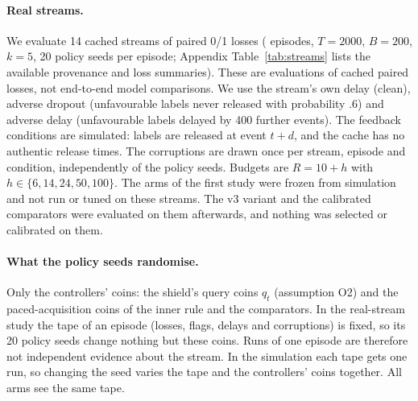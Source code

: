 \documentclass[10pt]{article}
\theoremstyle{plain}
\theoremstyle{definition}
\begin{document}
\paragraph{Real streams.}
We evaluate 14 cached streams of paired 0/1 losses (\NStreamEpisodes{} episodes, $T=2000$, $B=200$, $k=5$, 20 policy seeds per episode; Appendix Table~\ref{tab:streams} lists the available provenance and loss summaries). These are evaluations of cached paired losses, not end-to-end model comparisons. We use the stream's own delay (clean), adverse dropout (unfavourable labels never released with probability $.6$) and adverse delay (unfavourable labels delayed by 400 further events). The feedback conditions are simulated: labels are released at event $t+d$, and the cache has no authentic release times. The corruptions are drawn once per stream, episode and condition, independently of the policy seeds. Budgets are $R=10+h$ with $h\in\{6,14,24,50,100\}$. The arms of the first study were frozen from simulation and not run or tuned on these streams. The v3 variant and the calibrated comparators were evaluated on them afterwards, and nothing was selected or calibrated on them.

\paragraph{What the policy seeds randomise.}
Only the controllers' coins: the shield's query coins $q_t$ (assumption O2) and the paced-acquisition coins of the inner rule and the comparators. In the real-stream study the tape of an episode (losses, flags, delays and corruptions) is fixed, so its 20 policy seeds change nothing but these coins. Runs of one episode are therefore not independent evidence about the stream. In the simulation each tape gets one run, so changing the seed varies the tape and the controllers' coins together. All arms see the same tape.

\begin{table}[!htbp]
\caption{Simulation, $R=20$, pooled over \NRegimes{} regimes. $J$ is mean cost; ``vs never'' is the relative difference in $J$; harm quantiles are of $\sup_tH_t$. The exceedance columns report the mean of per-regime rates pooled across regimes and the rate in the worst regime, respectively. Full sampling has no violations; paced sampling has rare exceedances, while each heuristic comparator has a higher pooled rate.}\label{tab:sim}
\centering\small

\end{table}
\end{document}
